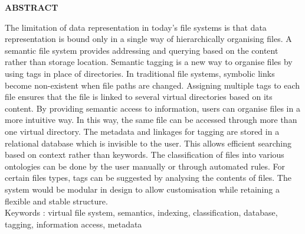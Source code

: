 \begin{center}
\thispagestyle{empty}
\vspace*{4\baselineskip}
\LARGE{\textbf{ABSTRACT}}\\[1.0cm]
\end{center}
\thispagestyle{empty}
\large{{The limitation of data representation in today's file systems is that data representation is bound only in a single way of hierarchically organising files. A semantic file system provides addressing and querying based on the content rather than storage location. Semantic tagging is a new way to organise files by using tags in place of directories.  In traditional file systems, symbolic links become non-existent when file paths are changed. Assigning multiple tags to each file ensures that the file is linked to several virtual directories based on its content. By providing semantic access to information, users can organise files in a more intuitive way. In this way, the same file can be accessed through more than one virtual directory. The metadata and linkages for tagging are stored in a relational database which is invisible to the user. This allows efficient searching based on context rather than keywords. The classification of files into various ontologies can be done by the user manually or through automated rules. For certain files types, tags can be suggested by analysing the contents of files. The system would be modular in design to allow customisation while retaining a flexible and stable structure. \\[1cm]}}
Keywords : virtual file system, semantics, indexing, classification, database, tagging, information access, metadata
